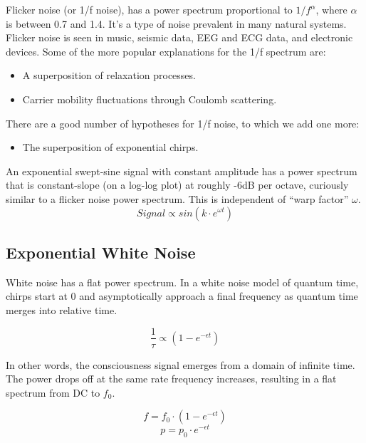 Flicker noise (or 1/f noise), has a power spectrum proportional to
$1/f^{\alpha}$, where $\alpha$ is between 0.7 and 1.4.
It's a type of noise prevalent in many natural systems.
Flicker noise \cite{Milotti} is seen in music, seismic data, EEG and ECG data,
and electronic devices.
Some of the more popular explanations for the 1/f spectrum are:
\begin{itemize}
	\item A superposition of relaxation processes.
	\item Carrier mobility fluctuations through Coulomb scattering.
\end{itemize}
There are a good number of hypotheses for 1/f noise, to which we add one more:
\begin{itemize}
	\item The superposition of exponential chirps.
\end{itemize}
An exponential swept-sine signal with constant amplitude has a power spectrum
\cite{Novak} that is constant-slope (on a log-log plot) at roughly -6dB
per octave, curiously similar to a flicker noise power spectrum.
This is independent of ``warp factor'' $\omega$.
\begin{equation}
Signal \propto sin(k \cdot e^{\omega t})
\end{equation}

\subsection{Exponential White Noise}

White noise has a flat power spectrum.
In a white noise model of quantum time, chirps start at 0 and asymptotically
approach a final frequency as quantum time merges into relative time.

\begin{equation} \label{eq:white}
\frac{1}{\tau} \propto (1-e^{-\epsilon t})
\end{equation}

In other words, the consciousness signal emerges from a domain of infinite time.
The power drops off at the same rate frequency increases,
resulting in a flat spectrum from DC to $f_0$.

\begin{equation}
f = f_0 \cdot (1-e^{-\epsilon t})
\end{equation}
\begin{equation}
p = p_0 \cdot e^{-\epsilon t}
\end{equation}

